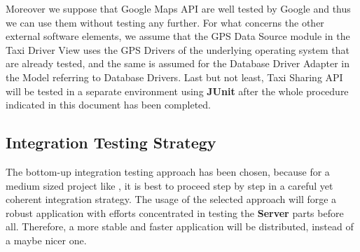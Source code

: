 Moreover we suppose that Google Maps API are well tested by Google and thus we can use them without testing any further.
For what concerns the other external software elements, we assume that the GPS Data Source module in the Taxi Driver View uses the GPS Drivers of the underlying operating system that are already tested, and the same is assumed for the Database Driver Adapter in the Model referring to Database Drivers.
Last but not least, \myTaxiService{} Taxi Sharing API will be tested in a separate environment using \textbf{JUnit} after the whole procedure indicated in this document has been completed.

\subsection{Integration Testing Strategy}
The bottom-up integration testing approach has been chosen, because for a medium sized project like \myTaxiService{}, it is best to proceed step by step in a careful yet coherent integration strategy.
The usage of the selected approach will forge a robust application with efforts concentrated in testing the \textbf{Server} parts before all.
Therefore, a more stable and faster application will be distributed, instead of a maybe nicer one.

